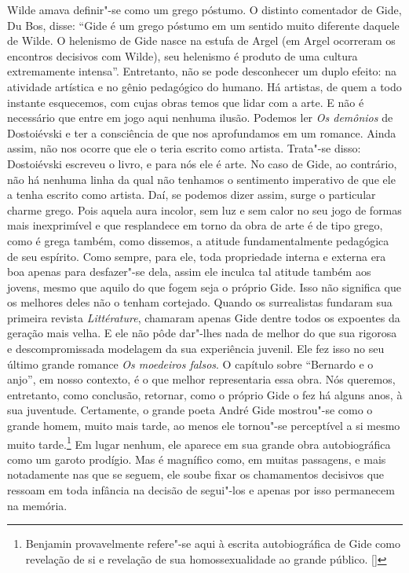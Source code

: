 Wilde amava definir"-se como um grego póstumo. O distinto comentador de
Gide, Du Bos, disse: ``Gide é um grego póstumo em um sentido muito
diferente daquele de Wilde. O helenismo de Gide nasce na estufa de Argel
(em Argel ocorreram os encontros decisivos com Wilde), seu helenismo é
produto de uma cultura extremamente intensa''. Entretanto, não se pode
desconhecer um duplo efeito: na atividade artística e no gênio pedagógico
do humano. Há artistas, de quem a todo instante esquecemos, com cujas obras temos que lidar com a arte. E não é necessário que entre em jogo
aqui nenhuma ilusão. Podemos ler \emph{Os demônios} de Dostoiévski e ter
a consciência de que nos aprofundamos em um romance. Ainda assim, não
nos ocorre que ele o teria escrito como artista. Trata"-se disso:
Dostoiévski escreveu o livro, e para nós ele é arte. No caso de Gide, ao
contrário, não há nenhuma linha da qual não tenhamos o sentimento
imperativo de que ele a tenha escrito como artista. Daí, se podemos dizer
assim, surge o particular charme grego. Pois aquela aura incolor, sem luz e sem
calor no seu jogo de formas mais inexprimível e que resplandece em torno da
obra de arte é de tipo grego, como é grega também, como dissemos, a atitude
fundamentalmente pedagógica de seu espírito. Como sempre, para ele, toda
propriedade interna e externa era boa apenas para desfazer"-se dela,
assim ele inculca tal atitude também aos jovens, mesmo que aquilo do que
fogem seja o próprio Gide. Isso não significa que os melhores deles não o
tenham cortejado. Quando os surrealistas fundaram sua primeira revista
\emph{Littérature}, chamaram apenas Gide dentre todos os expoentes
da geração mais velha. E ele não pôde dar"-lhes nada de melhor do que sua
rigorosa e descompromissada modelagem da sua experiência juvenil. Ele fez isso
no seu último grande romance \emph{Os moedeiros falsos}. O
capítulo sobre ``Bernardo e o anjo'', em nosso contexto, é o que melhor
representaria essa obra. Nós queremos, entretanto, como conclusão,
retornar, como o próprio Gide o fez há alguns anos, à sua juventude.
Certamente, o grande poeta André Gide mostrou"-se como o grande homem,
muito mais tarde, ao menos ele tornou"-se perceptível a si mesmo muito
tarde.\footnote{Benjamin provavelmente refere"-se aqui à escrita autobiográfica de Gide como revelação de si e revelação de sua homossexualidade ao grande público. []} Em lugar nenhum, ele aparece em sua grande obra autobiográfica
como um garoto prodígio. Mas é magnífico como, em muitas passagens,
e mais notadamente nas que se seguem, ele soube fixar os chamamentos
decisivos que ressoam em toda infância na decisão de segui"-los e
apenas por isso permanecem na memória.

